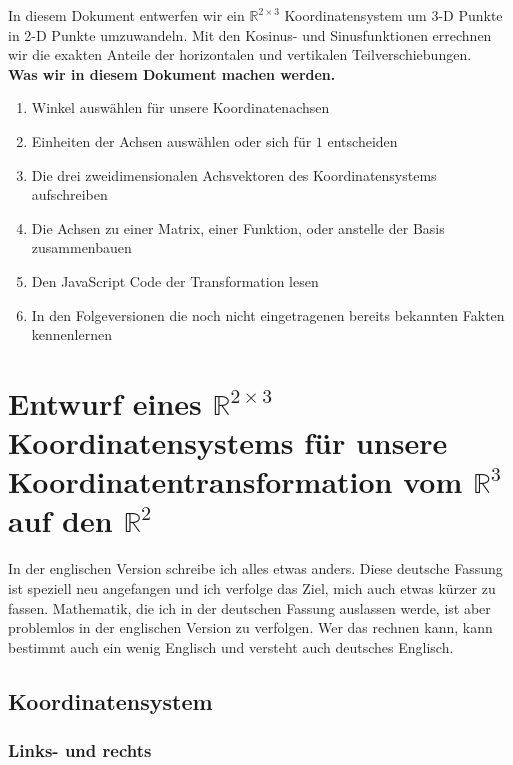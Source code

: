 \documentclass[a4paper]{article}
\begin{document}
In diesem Dokument entwerfen wir ein $\mathbb{R}^{2\times{3}}$ Koordinatensystem um 3-D Punkte in 2-D Punkte umzuwandeln.
Mit den Kosinus- und Sinusfunktionen errechnen wir die exakten Anteile der horizontalen und vertikalen Teilverschiebungen.\\

\textbf{Was wir in diesem Dokument machen werden.}

\begin{enumerate}
\item Winkel ausw\"ahlen f\"ur unsere Koordinatenachsen 
\item Einheiten der Achsen ausw\"ahlen oder sich f\"ur $1$ entscheiden
\item Die drei zweidimensionalen Achsvektoren des Koordinatensystems aufschreiben
\item Die Achsen zu einer Matrix, einer Funktion, oder anstelle der Basis zusammenbauen
\item Den JavaScript Code der Transformation lesen
\item In den Folgeversionen die noch nicht eingetragenen bereits bekannten Fakten kennenlernen

\end{enumerate}


\section{Entwurf eines $\mathbb{R}^{2\times{3}}$ Koordinatensystems f\"ur unsere Koordinatentransformation vom $\mathbb{R}^{3}$ auf den $\mathbb{R}^{2}$}

In der englischen Version schreibe ich alles etwas anders. Diese deutsche Fassung ist speziell neu angefangen und ich verfolge das
Ziel, mich auch etwas k\"urzer zu fassen. Mathematik, die ich in der deutschen Fassung auslassen werde, ist aber problemlos in der
englischen Version zu verfolgen. Wer das rechnen kann, kann bestimmt auch ein wenig Englisch und versteht auch deutsches Englisch.\\

\subsection{Koordinatensystem}
\subsubsection{Links- und rechts}
\end{document}
